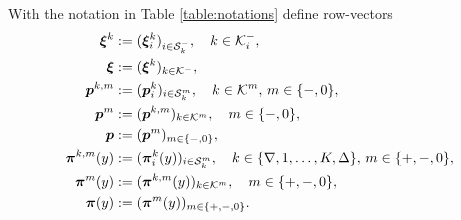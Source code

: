 %
 
With the notation in Table \ref{table:notations} define row-vectors 
 \begin{align*}
	{\boldsymbol{\xi}}^k &:= ( \boldsymbol\xi_{i}^k)_{i\in\mathcal{S}_k^-}, \quad  {k\in\mathcal K_i^-},
	\\ {\boldsymbol{\xi}}& := ( \boldsymbol \xi^k)_{k\in\mathcal K^-},
	\\\boldsymbol{p}^{k,m} &:= (  \boldsymbol p_{i}^k)_{i\in\mathcal{S}_k^m}, \quad  k\in{\mathcal K^m},\, m\in\{-,0\},
	\\ {\boldsymbol{p}^m} &:= (  \boldsymbol p^{k,m})_{k\in\mathcal K^m},\quad m\in\{-,0\},
	\\ {\boldsymbol{p}} &:= (  \boldsymbol p^m)_{m\in\{-,0\}},
	\\{\boldsymbol{\pi}}^{k,m}(y) &:= (  \boldsymbol \pi_{i}^k(y))_{i\in\mathcal{S}_k^m},\quad  k\in\{\nabla,1,\dots,K,\Delta\},\,m\in\{+,-,0\},
	\\{\boldsymbol{\pi}}^m(y) &:= (\boldsymbol \pi^{k,m}(y))_{k\in\mathcal K^m},\quad  m\in\{+,-,0\},
	\\ {\boldsymbol{\pi}}(y) &:= (  \boldsymbol \pi^m(y))_{m\in\{+,-,0\}}.
 \end{align*}
 
